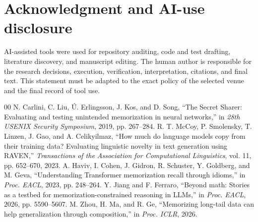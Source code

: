 \documentclass[conference]{IEEEtran}
\begin{document}
\section*{Acknowledgment and AI-use disclosure}
AI-assisted tools were used for repository auditing, code and test drafting, literature discovery, and manuscript
editing. The human author is responsible for the research decisions, execution, verification, interpretation,
citations, and final text. This statement must be adapted to the exact policy of the selected venue and the final
record of tool use.

\begin{thebibliography}{00}
 N. Carlini, C. Liu, {\'U}. Erlingsson, J. Kos, and D. Song, ``The Secret Sharer:
Evaluating and testing unintended memorization in neural networks,'' in \emph{28th USENIX Security Symposium},
2019, pp. 267--284.
 R. T. McCoy, P. Smolensky, T. Linzen, J. Gao, and A. Celikyilmaz, ``How much do language
models copy from their training data? Evaluating linguistic novelty in text generation using RAVEN,''
\emph{Transactions of the Association for Computational Linguistics}, vol. 11, pp. 652--670, 2023.
 A. Haviv, I. Cohen, J. Gidron, R. Schuster, Y. Goldberg, and M. Geva, ``Understanding
Transformer memorization recall through idioms,'' in \emph{Proc. EACL}, 2023, pp. 248--264.
 Y. Jiang and F. Ferraro, ``Beyond math: Stories as a testbed for
memorization-constrained reasoning in LLMs,'' in \emph{Proc. EACL}, 2026, pp. 5590--5607.
 M. Zhou, H. Ma, and R. Ge, ``Memorizing long-tail data can help generalization through
composition,'' in \emph{Proc. ICLR}, 2026.
\end{thebibliography}
\end{document}
